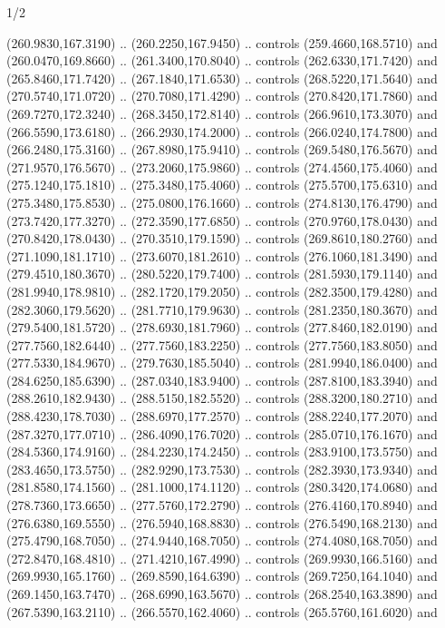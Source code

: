 \begin{flagdescription}{1/2}
\begin{scope}[xshift=0.5\flaglength]
\begin{scope}[scale=0.004\flagwidth,xshift=-90mm,yshift=89mm]
\begin{scope}[y=0.80pt, x=0.80pt, yscale=-1, xscale=1, inner sep=0pt, outer sep=0pt]
\begin{scope}[cm={{-1.0,0.0,0.0,1.0,(639.96566,0.0)}},shift={(0,0)}]
  (260.9830,167.3190) .. (260.2250,167.9450) .. controls (259.4660,168.5710) and
  (260.0470,169.8660) .. (261.3400,170.8040) .. controls (262.6330,171.7420) and
  (265.8460,171.7420) .. (267.1840,171.6530) .. controls (268.5220,171.5640) and
  (270.5740,171.0720) .. (270.7080,171.4290) .. controls (270.8420,171.7860) and
  (269.7270,172.3240) .. (268.3450,172.8140) .. controls (266.9610,173.3070) and
  (266.5590,173.6180) .. (266.2930,174.2000) .. controls (266.0240,174.7800) and
  (266.2480,175.3160) .. (267.8980,175.9410) .. controls (269.5480,176.5670) and
  (271.9570,176.5670) .. (273.2060,175.9860) .. controls (274.4560,175.4060) and
  (275.1240,175.1810) .. (275.3480,175.4060) .. controls (275.5700,175.6310) and
  (275.3480,175.8530) .. (275.0800,176.1660) .. controls (274.8130,176.4790) and
  (273.7420,177.3270) .. (272.3590,177.6850) .. controls (270.9760,178.0430) and
  (270.8420,178.0430) .. (270.3510,179.1590) .. controls (269.8610,180.2760) and
  (271.1090,181.1710) .. (273.6070,181.2610) .. controls (276.1060,181.3490) and
  (279.4510,180.3670) .. (280.5220,179.7400) .. controls (281.5930,179.1140) and
  (281.9940,178.9810) .. (282.1720,179.2050) .. controls (282.3500,179.4280) and
  (282.3060,179.5620) .. (281.7710,179.9630) .. controls (281.2350,180.3670) and
  (279.5400,181.5720) .. (278.6930,181.7960) .. controls (277.8460,182.0190) and
  (277.7560,182.6440) .. (277.7560,183.2250) .. controls (277.7560,183.8050) and
  (277.5330,184.9670) .. (279.7630,185.5040) .. controls (281.9940,186.0400) and
  (284.6250,185.6390) .. (287.0340,183.9400) .. controls (287.8100,183.3940) and
  (288.2610,182.9430) .. (288.5150,182.5520) .. controls (288.3200,180.2710) and
  (288.4230,178.7030) .. (288.6970,177.2570) .. controls (288.2240,177.2070) and
  (287.3270,177.0710) .. (286.4090,176.7020) .. controls (285.0710,176.1670) and
  (284.5360,174.9160) .. (284.2230,174.2450) .. controls (283.9100,173.5750) and
  (283.4650,173.5750) .. (282.9290,173.7530) .. controls (282.3930,173.9340) and
  (281.8580,174.1560) .. (281.1000,174.1120) .. controls (280.3420,174.0680) and
  (278.7360,173.6650) .. (277.5760,172.2790) .. controls (276.4160,170.8940) and
  (276.6380,169.5550) .. (276.5940,168.8830) .. controls (276.5490,168.2130) and
  (275.4790,168.7050) .. (274.9440,168.7050) .. controls (274.4080,168.7050) and
  (272.8470,168.4810) .. (271.4210,167.4990) .. controls (269.9930,166.5160) and
  (269.9930,165.1760) .. (269.8590,164.6390) .. controls (269.7250,164.1040) and
  (269.1450,163.7470) .. (268.6990,163.5670) .. controls (268.2540,163.3890) and
  (267.5390,163.2110) .. (266.5570,162.4060) .. controls (265.5760,161.6020) and

\end{scope}
\end{scope}
\end{scope}
\end{scope}
\end{flagdescription}
